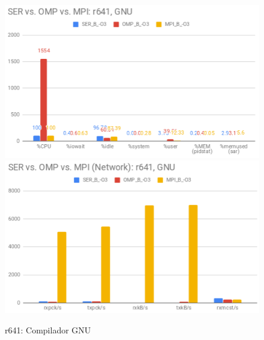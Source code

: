 \documentclass{article}
\begin{document}
\begin{appendices}
\begin{figure}[H]
    \centering
    \includegraphics[width=12cm]{Pictures/LUMZ_SER_OMP_MPI_r641_GNU_Comp.png}
    \includegraphics[width=12cm]{Pictures/LUMZ_SER_OMP_MPI_r641_GNU_Comm.png}
    \caption{r641: Compilador GNU}
    \label{fig:lumz_ser_omp_mpi_r641_gnu}
\end{figure}


\end{appendices}
\end{document}
